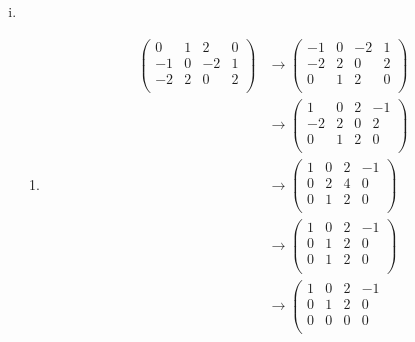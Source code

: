 \documentclass{article}
\begin{document}
\begin{enumerate}[(i)]
\item
  \begin{enumerate}
  \item
    \begin{align*}
      \left(
      \begin{array}{ccc|c}
        0  & 1 & 2  & 0\\
        -1 & 0 & -2 & 1\\
        -2 & 2 &  0 & 2\\
      \end{array}
      \right)
      &\rightarrow
      \left(
        \begin{array}{ccc|c}
          -1 & 0 & -2 & 1\\
          -2 & 2 &  0 & 2\\
          0  & 1 & 2  & 0\\
        \end{array}
      \right) \\
      &\rightarrow
      \left(
        \begin{array}{ccc|c}
          1  & 0 & 2 & -1\\
          -2 & 2 & 0 & 2\\
          0  & 1 & 2 & 0\\
        \end{array}
      \right) \\
      &\rightarrow
      \left(
        \begin{array}{ccc|c}
          1 & 0 & 2 & -1\\
          0 & 2 & 4 & 0\\
          0 & 1 & 2 & 0\\
        \end{array}
      \right) \\
      &\rightarrow
      \left(
        \begin{array}{ccc|c}
          1 & 0 & 2 & -1\\
          0 & 1 & 2 & 0\\
          0 & 1 & 2 & 0\\
        \end{array}
      \right) \\
      &\rightarrow
      \left(
        \begin{array}{ccc|c}
          1 & 0 & 2 & -1\\
          0 & 1 & 2 & 0\\
          0 & 0 & 0 & 0\\

\end{array}
\end{align*}
\end{enumerate}
\end{enumerate}
\end{document}
